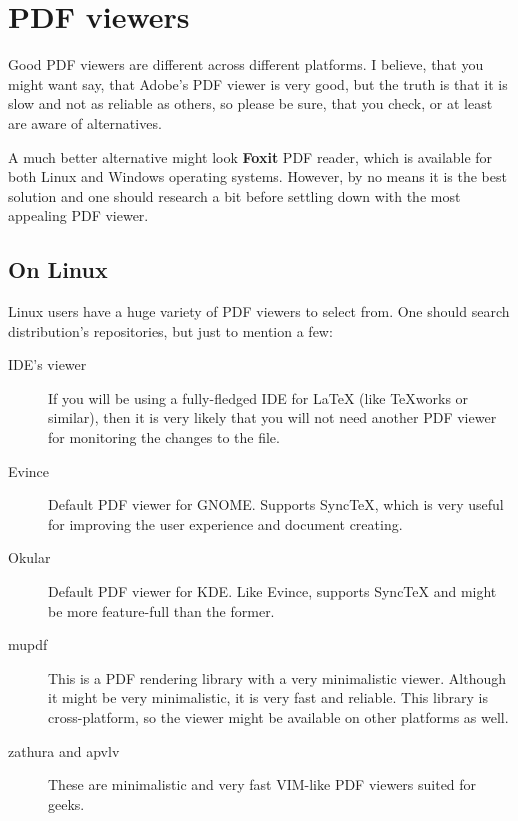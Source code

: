 \documentclass[
    draft
]{scrartcl}
\begin{document}
\section{PDF viewers}

%
Good PDF viewers are different across different platforms.
%
I believe, that you might want say, that Adobe's PDF viewer is very good, but
    the truth is that it is slow and not as reliable as others, so please be
    sure, that you check, or at least are aware of alternatives.

%
A much better alternative might look \textbf{Foxit} PDF reader, which is
    available for both Linux and Windows operating systems.
%
However, by no means it is the best solution and one should research a bit
    before settling down with the most appealing PDF viewer.

%
\subsection{On Linux}

%
Linux users have a huge variety of PDF viewers to select from.
%
One should search distribution's repositories, but just to mention a few:
\begin{description}
    \item[IDE's viewer]
        If you will be using a fully-fledged IDE for \LaTeX{} (like \TeX{}works
            or similar), then it is very likely that you will not need another
            PDF viewer for monitoring the changes to the  file.
    \item[Evince]
        Default PDF viewer for GNOME.
        Supports Sync\TeX{}, which is very useful for improving the user
            experience and document creating.
    \item[Okular] 
        Default PDF viewer for KDE.
        Like Evince, supports Sync\TeX{} and might be more feature-full than the
            former.
    \item[mupdf]
        This is a PDF rendering library with a very minimalistic viewer.
        Although it might be very minimalistic, it is very fast and reliable.
        This library is cross-platform, so the viewer might be available on
            other platforms as well.
    \item[zathura and apvlv]
        These are minimalistic and very fast VIM-like PDF viewers suited for
            geeks.
\end{description}
\end{document}
